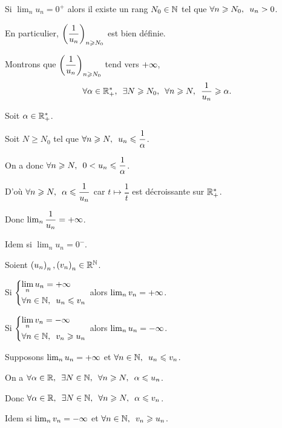 \begin{dem}[4]
Si \(\lim_nu_n=0^+\) alors il existe un rang \(N_0\in\mathbb{N}\) tel que \(\quantifs{\forall n\geq N_0}u_n>0\).

En particulier, \(\left(\dfrac{1}{u_n}\right)_{n\geqslant N_0}\) est bien définie.

Montrons que \(\left(\dfrac{1}{u_n}\right)_{n\geqslant N_0}\) tend vers \(+\infty\), \cad \[\quantifs{\forall\alpha\in\Rps;\exists N\geq N_0;\forall n\geq N}\dfrac{1}{u_n}\geq\alpha.\]

Soit \(\alpha\in\mathbb{R}_+^*\).

Soit \(N\geq N_0\) tel que \(\quantifs{\forall n\geq N}u_n\leq\dfrac{1}{\alpha}\).

On a donc \(\quantifs{\forall n\geq N}0<u_n\leq\dfrac{1}{\alpha}\).

D'où \(\quantifs{\forall n\geq N}\alpha\leq\dfrac{1}{u_n}\) car \(t\mapsto\dfrac{1}{t}\) est décroissante sur \(\mathbb{R}_+^*\).

Donc \(\lim_n\dfrac{1}{u_n}=+\infty\).

Idem si \(\lim_nu_n=0^-\).
\end{dem}

\begin{theo}
Soient \(\left(u_n\right)_n,\left(v_n\right)_n\in\mathbb{R}^{\mathbb{N}}\).

Si \(\begin{dcases}\lim_nu_n=\pinf \\ \quantifs{\forall n\in\N}u_n\leq v_n\end{dcases}\) alors \(\lim_nv_n=+\infty\).

Si \(\begin{dcases}\lim_nv_n=\minf \\ \quantifs{\forall n\in\N}v_n\geq u_n\end{dcases}\) alors \(\lim_nu_n=-\infty\).
\end{theo}

\begin{dem}
Supposons \(\lim_nu_n=+\infty\) et \(\quantifs{\forall n\in\N}u_n\leq v_n\).

On a \(\quantifs{\forall\alpha\in\R;\exists N\in\N;\forall n\geq N}\alpha\leq u_n\).

Donc \(\quantifs{\forall\alpha\in\R;\exists N\in\N;\forall n\geq N}\alpha\leq v_n\).

Idem si \(\lim_nv_n=-\infty\) et \(\quantifs{\forall n\in\N}v_n\geq u_n\).
\end{dem}

